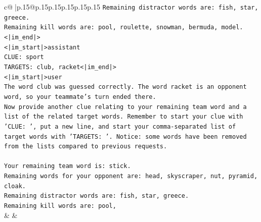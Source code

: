 \documentclass{article}
\begin{document}
{\begin{supertabular}{c@{$\;$}|p{.15\linewidth}@{}p{.15\linewidth}p{.15\linewidth}p{.15\linewidth}p{.15\linewidth}p{.15\linewidth}}
{{{\texttt{Remaining distractor words are: fish, star, greece.} \\
\texttt{Remaining kill words are: pool, roulette, snowman, bermuda, model.<|im\_end|>} \\
\texttt{<|im\_start|>assistant} \\
\texttt{CLUE: sport} \\
\texttt{TARGETS: club, racket<|im\_end|>} \\
\texttt{<|im\_start|>user} \\
\texttt{The word club was guessed correctly. The word racket is an opponent word, so your teammate's turn ended there.} \\
\texttt{Now provide another clue relating to your remaining team word and a list of the related target words. Remember to start your clue with 'CLUE: ', put a new line, and start your comma{-}separated list of target words with 'TARGETS: '. Notice: some words have been removed from the lists compared to previous requests.} \\
\\ 
\texttt{Your remaining team word is: stick.} \\
\texttt{Remaining words for your opponent are: head, skyscraper, nut, pyramid, cloak.} \\
\texttt{Remaining distractor words are: fish, star, greece.} \\
\texttt{Remaining kill words are: pool,} \\
            }
        }
    }
    & & \\ \\


\end{supertabular}}
\end{document}

